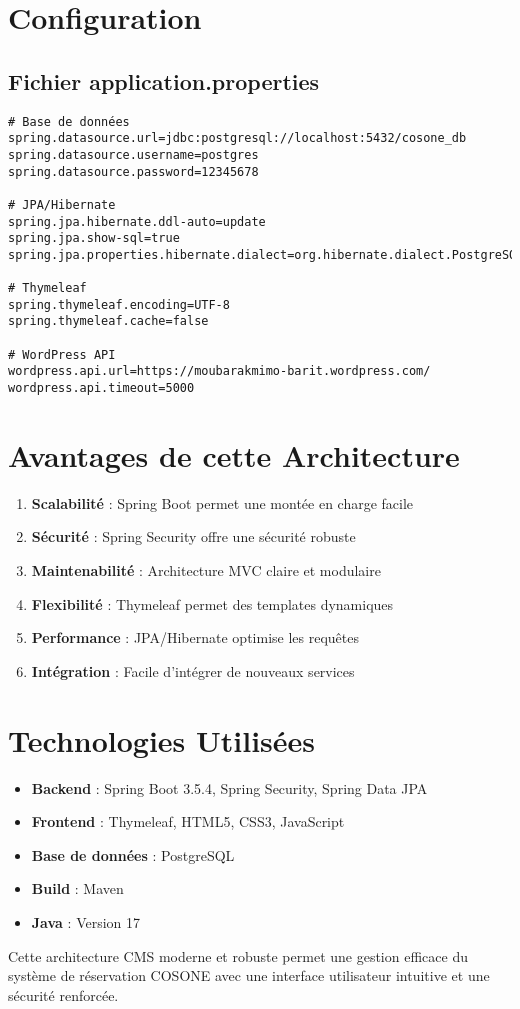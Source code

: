 \documentclass[12pt,a4paper]{article}
\begin{document}
\section{Configuration}

\subsection{Fichier application.properties}

\begin{lstlisting}[caption=Configuration de l'application]
# Base de données
spring.datasource.url=jdbc:postgresql://localhost:5432/cosone_db
spring.datasource.username=postgres
spring.datasource.password=12345678

# JPA/Hibernate
spring.jpa.hibernate.ddl-auto=update
spring.jpa.show-sql=true
spring.jpa.properties.hibernate.dialect=org.hibernate.dialect.PostgreSQLDialect

# Thymeleaf
spring.thymeleaf.encoding=UTF-8
spring.thymeleaf.cache=false

# WordPress API
wordpress.api.url=https://moubarakmimo-barit.wordpress.com/
wordpress.api.timeout=5000
\end{lstlisting}

\section{Avantages de cette Architecture}

\begin{enumerate}
    \item \textbf{Scalabilité} : Spring Boot permet une montée en charge facile
    \item \textbf{Sécurité} : Spring Security offre une sécurité robuste
    \item \textbf{Maintenabilité} : Architecture MVC claire et modulaire
    \item \textbf{Flexibilité} : Thymeleaf permet des templates dynamiques
    \item \textbf{Performance} : JPA/Hibernate optimise les requêtes
    \item \textbf{Intégration} : Facile d'intégrer de nouveaux services
\end{enumerate}

\section{Technologies Utilisées}

\begin{itemize}
    \item \textbf{Backend} : Spring Boot 3.5.4, Spring Security, Spring Data JPA
    \item \textbf{Frontend} : Thymeleaf, HTML5, CSS3, JavaScript
    \item \textbf{Base de données} : PostgreSQL
    \item \textbf{Build} : Maven
    \item \textbf{Java} : Version 17
\end{itemize}

Cette architecture CMS moderne et robuste permet une gestion efficace du système de réservation COSONE avec une interface utilisateur intuitive et une sécurité renforcée.
\end{document}
